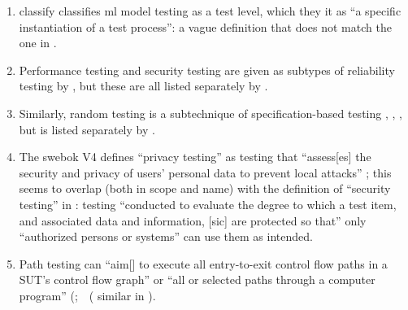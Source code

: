 \begin{enumerate}
    \item %
           \citetISTQB{} \ifnotpaper classify \else classifies \fi
          \acs{ml} model testing as a test level, which \ifnotpaper they \else
              it \fi {} as ``a specific instantiation of a
          test process'': a vague definition that does not match the one in
          .
    \item %
          Performance testing and security testing are given as subtypes of
          reliability testing by \citet{ISO_IEC2023a}, but these are all listed
          separately by \citet[p.~53]{Firesmith2015}.
    \item %
          Similarly, random testing is a subtechnique of specification-based
          testing \ifnotpaper
              \citetext{\citealp[pp.~7, 22]{IEEE2022};
                  \citeyear[pp.~5, 20, Fig.~2]{IEEE2021};
                  \citealp[p.~5\=/12]{SWEBOK2024}; \citealpISTQB{}} \else
              \cite[pp.~7, 22]{IEEE2022}, \cite{ISTQB},
              \cite[p.~5\=/12]{SWEBOK2024}, \cite[pp.~5, 20, Fig.~2]{IEEE2021}
          \fi but is listed
          separately by \citet[p.~46]{Firesmith2015}.
    \item %
          The \acs{swebok} V4 defines ``privacy testing'' as testing that
          ``assess[es] the security and privacy of users' personal data to
          prevent local attacks'' \citep[p.~5-10]{SWEBOK2024}; this seems to
          overlap (both in scope and name) with the definition of ``security
          testing'' in \citep[p.~7]{IEEE2022}: testing
          ``conducted to evaluate the degree to which a test item, and
          associated data and information, [sic] are protected so that'' only
          ``authorized persons or systems'' can use them as intended.
    \item %
          Path testing can ``aim[] to execute all entry-to-exit control flow
          paths in a SUT's control flow graph'' \citep[p.~5-13]{SWEBOK2024} or
          ``all or selected paths through a computer program''
          \ifnotpaper (\else \fi \citealp[p.~316]{IEEE2017}\ifnotpaper;\ \else\ (\fi%
          similar in \citealp[p.~119]{Patton2006}).

\end{enumerate}
